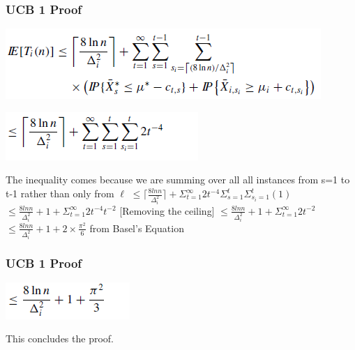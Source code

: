 \documentclass{beamer}
\begin{document}

\begin{frame}
\frametitle{UCB 1 Proof}
\begin{tabbing}
\hspace*{.25in}
\includegraphics[scale=0.7]{img/line6.png}
\end{tabbing}

\begin{tabbing}
\hspace*{.25in}
\includegraphics[scale=0.7]{img/line7.png}
\end{tabbing}

The inequality comes because we are summing over all all instances from s=1 to t-1 rather than only from $\ell$
\newline
$\leq \lceil \frac{8ln n}{\Delta_{i}^{2}}\rceil + \Sigma_{t=1}^{\infty}2t^{-4}\Sigma_{s=1}^{t}\Sigma_{s_{i}=1}^{t}(1)$ 
\newline
$\leq  \frac{8ln n}{\Delta_{i}^{2}} + 1 + \Sigma_{t=1}^{\infty}2t^{-4}t^{-2}$ [Removing the ceiling]
\newline
$\leq  \frac{8ln n}{\Delta_{i}^{2}} + 1 + \Sigma_{t=1}^{\infty}2t^{-2}$
\newline
$\leq  \frac{8ln n}{\Delta_{i}^{2}} + 1 + 2\times\frac{\pi^{2}}{6}$ from Basel's Equation

\end{frame}


\begin{frame}
\frametitle{UCB 1 Proof}
\begin{tabbing}
\hspace*{.25in}
\includegraphics[scale=0.7]{img/line8.png}
\end{tabbing}

This concludes the proof.
\end{frame}
\end{document}
